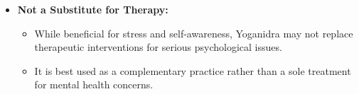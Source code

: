 \begin{frame}[fragile]
\begin{itemize}
        \item \textbf{Not a Substitute for Therapy:}
            \begin{itemize}
                \item While beneficial for stress and self-awareness, Yoganidra may not replace therapeutic interventions for serious psychological issues.
                \item It is best used as a complementary practice rather than a sole treatment for mental health concerns.
            \end{itemize}
        
        
    \end{itemize}
\end{frame}
